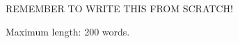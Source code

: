 REMEMBER TO WRITE THIS FROM SCRATCH!

Maximum length: 200 words.

\begin{comment}
A new method for measuring thermal conductivity is being adapted from the
standard method of measuring isotropic thermal conductivity with needle probes,
ASTM D5334, in order to enable the dertermination of an anisotropic thermal
conductivity. This method will have particular relevance to measuring thermal
conductivity of natural snowpacks where conductivity  can be strongly
anisotropic due to vertical thermal gradients, compaction and metamorphosis.
Needle probes, such as specified in ASTM D5334, consist of a thin needle
embedded with a constant-flux heating element and a thermocouple or thermistor.
Thermal conductivity of the surrounding material is calculated analytically
using needle temperature data as a function of time.

This new method uses finite element numerical solutions for apparent thermal
conductivity as a function of actual anisotropic thermal conductivity and needle
orientation. Values for anisotropic thermal conductivity are determined by
curve-fitting a function relating apparent results of the ASTM method at given
needle orientations and the actual solutions. The results of the numerical
simulations may then be applied to the measurement of actual anisotropic
materials. Unlike ASTM D5334, multiple measurements at different orientations
are required, and relies the number of free variables in the heat equation
(with an upper bound of six for a symmetric conductivity matrix, which may be
reduced with further simplifications).

The applicability and feasibility of this technique for improving arctic climate
models, which can strongly depend on snow conductivity, will be discussed.
\end{comment}

